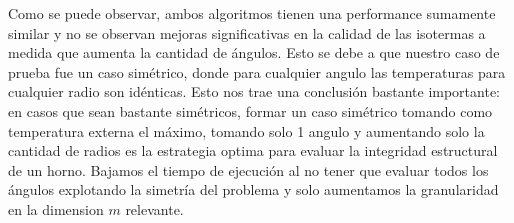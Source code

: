 Como se puede observar, ambos algoritmos tienen una performance sumamente similar y no se observan mejoras significativas en la calidad de las isotermas a medida que aumenta la cantidad de ángulos. Esto se debe a que nuestro caso de prueba fue un caso simétrico, donde para cualquier angulo las temperaturas para cualquier radio son idénticas. Esto nos trae una conclusión bastante importante: en casos que sean bastante simétricos, formar un caso simétrico tomando como temperatura externa el máximo, tomando solo 1 angulo y aumentando solo la cantidad de radios es la estrategia optima para evaluar la integridad estructural de un horno. Bajamos el tiempo de ejecución al no tener que evaluar todos los ángulos explotando la simetría del problema y solo aumentamos la granularidad en la dimension $m$ relevante.
